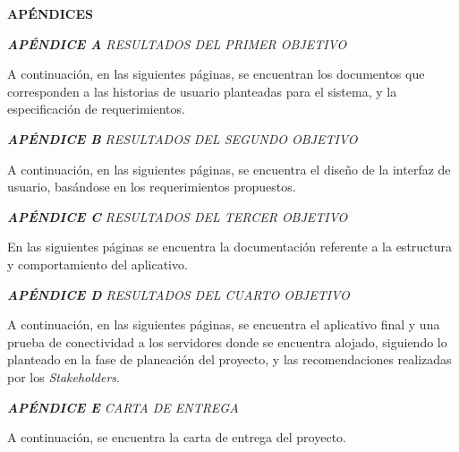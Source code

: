 \documentclass[spanish]{ieee_upb}
\begin{document}
\newpage
\renewcommand\refname{REFERENCIAS}

\newpage
\renewcommand\refname{REFERENCIAS}



\newpage
{}
\begin{center}
\textbf{APÉNDICES}
\end{center}
\appendix

\raggedright\textit{\textbf{APÉNDICE A} RESULTADOS DEL PRIMER OBJETIVO}
\label{APÉNDICE:a}

A continuación, en las siguientes páginas, se encuentran los documentos que corresponden a las historias de usuario planteadas para el sistema, y la especificación de requerimientos. 





\raggedright\textit{\textbf{APÉNDICE B} RESULTADOS DEL SEGUNDO OBJETIVO}
\label{APÉNDICE:B}

A continuación, en las siguientes páginas, se encuentra el diseño de la interfaz de usuario, basándose en los requerimientos propuestos. 



\raggedright\textit{\textbf{APÉNDICE C} RESULTADOS DEL TERCER OBJETIVO}
\label{APÉNDICE:C}

En las siguientes páginas se encuentra la documentación referente a la estructura y comportamiento
del aplicativo.  



\raggedright\textit{\textbf{APÉNDICE D} RESULTADOS DEL CUARTO OBJETIVO}
\label{APÉNDICE:D}

A continuación, en las siguientes páginas, se encuentra el aplicativo final y una prueba de conectividad a los servidores donde se encuentra alojado, siguiendo lo planteado en la fase de planeación del proyecto, y las recomendaciones realizadas por los \textit{Stakeholders}. 




\raggedright\textit{\textbf{APÉNDICE E} CARTA DE ENTREGA}
\label{APÉNDICE:E}

A continuación, se encuentra la carta de entrega del proyecto. 


\end{document}
